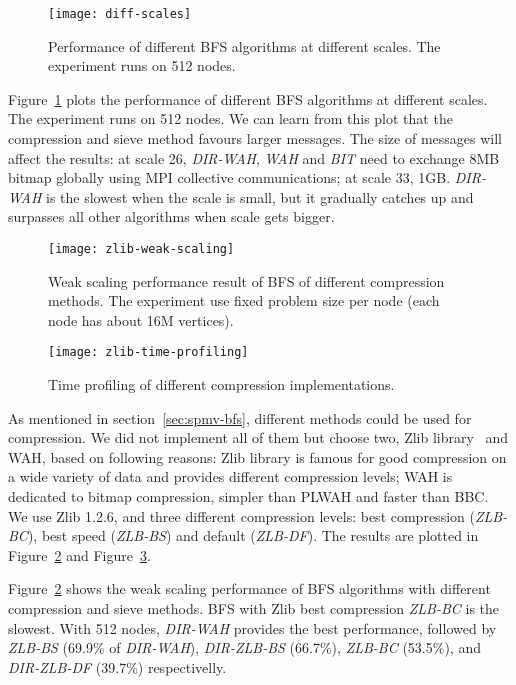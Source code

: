 \documentclass[conference]{IEEEtran}
\begin{document}
\begin{figure}[t]
  \centering
  \texttt{[image: diff-scales]}
  \caption{Performance of different BFS algorithms at different scales. The
    experiment runs on 512 nodes.}
  \label{fig:diff-scales}
\end{figure}
Figure~\ref{fig:diff-scales} plots the performance of different BFS algorithms
at different scales. The experiment runs on 512 nodes. We can learn from this
plot that the compression and sieve method favours larger messages. The size
of messages will affect the results: at scale 26, \textit{DIR-WAH},
\textit{WAH} and \textit{BIT} need to exchange 8MB bitmap globally using MPI
collective communications; at scale 33, 1GB. \textit{DIR-WAH} is the slowest
when the scale is small, but it gradually catches up and surpasses all other
algorithms when scale gets bigger. 

\begin{figure}[t]
  \centering
  \texttt{[image: zlib-weak-scaling]}
  \caption{Weak scaling performance result of BFS of different compression
    methods. The experiment use fixed problem size per node (each node has
    about 16M vertices).}
  \label{fig:zlib-weak-scaling}
\end{figure}

\begin{figure}[t]
  \centering
  \texttt{[image: zlib-time-profiling]}
  \caption{Time profiling of different compression implementations.}
  \label{fig:zlib-time-profiling}
\end{figure}

As mentioned in section~\ref{sec:spmv-bfs}, different methods could be used
for compression. We did not implement all of them but choose two, Zlib
library~\cite{zlib-homepage} and WAH, based on following reasons: Zlib library
is famous for good compression on a wide variety of data and provides
different compression levels; WAH is dedicated to bitmap compression, simpler
than PLWAH and faster than BBC. We use Zlib 1.2.6, and three different
compression levels: best compression (\textit{ZLB-BC}), best speed
(\textit{ZLB-BS}) and default (\textit{ZLB-DF}). The results are plotted in
Figure~\ref{fig:zlib-weak-scaling} and Figure~\ref{fig:zlib-time-profiling}.

Figure~\ref{fig:zlib-weak-scaling} shows the weak scaling performance of BFS
algorithms with different compression and sieve methods. BFS with Zlib best
compression \textit{ZLB-BC} is the slowest. With 512 nodes, \textit{DIR-WAH}
provides the best performance, followed by \textit{ZLB-BS} (69.9\% of
\textit{DIR-WAH}), \textit{DIR-ZLB-BS} (66.7\%), \textit{ZLB-BC} (53.5\%), and
\textit{DIR-ZLB-DF} (39.7\%) respectivelly.
\end{document}
